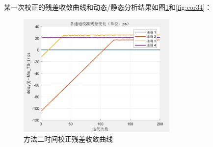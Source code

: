 \documentclass[cs4size,a4paper]{ctexart}
\numberwithin{equation}{section}
\numberwithin{table}{section}
\numberwithin{figure}{section}
\begin{document}
		
		
		
		
		某一次校正的残差收敛曲线和动态/静态分析结果如图\ref{fig:cor2}和\ref{fig:cor34}：
		\begin{figure}[H]
			\centering
			\includegraphics[width=0.7\textwidth]{figure/cor2.png}
			\caption{方法二时间校正残差收敛曲线} \label{fig:cor2}
		\end{figure}
		
		
		
\end{document}
